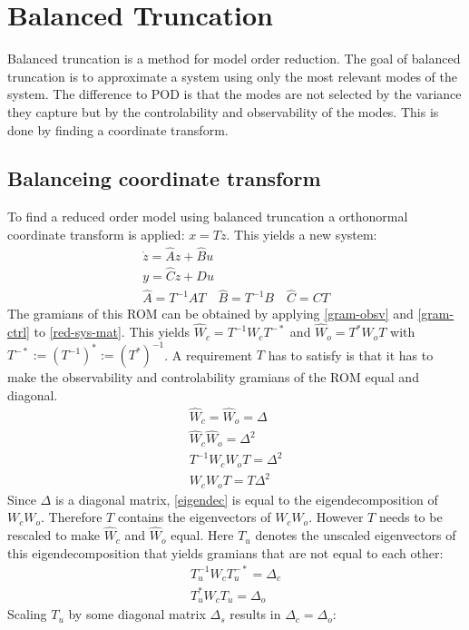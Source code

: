 \section{Balanced Truncation}
Balanced truncation is a method for model order reduction.
The goal of balanced truncation is to approximate a system using only the most relevant modes of the system.
The difference to POD is that the modes are not selected by the variance they capture but by the controlability and observability of the modes.
This is done by finding a coordinate transform.
\subsection{Balanceing coordinate transform}
To find a reduced order model using balanced truncation a orthonormal coordinate transform is applied: \(x = Tz\).
This yields a new system:
\begin{gather}
\dot{z} = \hat{A}z + \hat{B}u \label{z1}\\
y = \hat{C}z + Du \label{z2} \\
\hat{A} = T^{-1}AT \quad \hat{B} = T^{-1}B \quad \hat{C} = CT \label{red-sys-mat}
\end{gather}
The gramians of this ROM can be obtained by applying  \ref{gram-obsv} and \ref{gram-ctrl} to \ref{red-sys-mat}.
This yields \(\hat{W}_c = T^{-1}W_cT^{-*}\) and \(\hat{W}_o = T^{*}W_oT\) with  \(T^{-*} := (T^{-1})^{*} := (T^{*})^{-1}\).
A requirement \(T\) has to satisfy is that it has to make the observability and controlability gramians of the ROM equal and diagonal.
\begin{gather}
\hat{W}_c = \hat{W}_o = \Delta \\
\hat{W}_c \hat{W}_o = \Delta^{2} \\
T^{-1}W_cW_oT = \Delta^{2} \\
W_cW_oT = T\Delta^{2} \label{eigendec}
\end{gather}
Since \(\Delta\) is a diagonal matrix, \ref{eigendec} is equal to the eigendecomposition of \(W_cW_o\).
Therefore \(T\) contains the eigenvectors of \(W_cW_o\).
However \(T\) needs to be rescaled to make \(\hat{W}_c\) and \(\hat{W}_o\) equal.
Here \(T_u\) denotes the unscaled eigenvectors of this eigendecomposition that yields gramians that are not equal to each other:
\begin{gather}
T_u^{-1}W_cT_u^{-*} = \Delta_c \label{1}\\
T_u^{*}W_cT_u = \Delta_o \label{2}
\end{gather}
Scaling \(T_u\) by some diagonal matrix \(\Delta_s\) results in \(\Delta_c = \Delta_o\):
